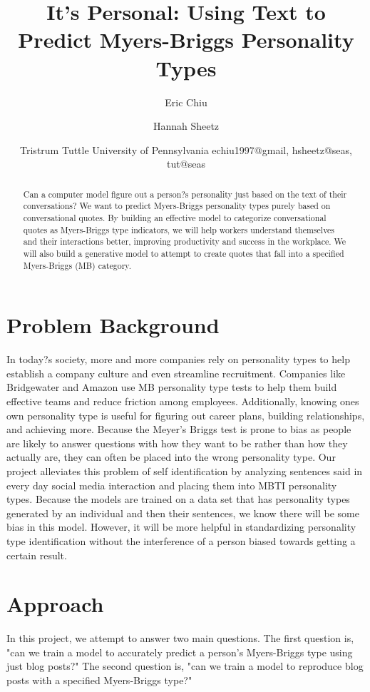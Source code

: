 \documentclass{article}
\title{It's Personal: Using Text to Predict Myers-Briggs Personality Types}
\author{
Eric Chiu\and
Hannah Sheetz\and
Tristrum Tuttle
\affiliations
University of Pennsylvania
\emails
echiu1997@gmail, hsheetz@seas, tut@seas
}
\begin{document}
\maketitle

\begin{abstract}
Can a computer model figure out a person?s personality just based on the text of their conversations? We want to predict Myers-Briggs personality types purely based on conversational quotes. By building an effective model to categorize conversational quotes as Myers-Briggs type indicators, we will help workers understand themselves and their interactions better, improving productivity and success in the workplace. We will also build a generative model to attempt to create quotes that fall into a specified Myers-Briggs (MB) category.
\end{abstract}

\section{Problem Background}
In today?s society, more and more companies rely on personality types to help establish a company culture and even streamline recruitment. Companies like Bridgewater and Amazon use MB personality type tests to help them build effective teams and reduce friction among employees. Additionally, knowing ones own personality type is useful for figuring out career plans, building relationships, and achieving more. Because the Meyer's Briggs test is prone to bias as people are likely to answer questions with how they want to be rather than how they actually are, they can often be placed into the wrong personality type. Our project alleviates this problem of self identification by analyzing sentences said in every day social media interaction and placing them into MBTI personality types. Because the models are trained on a data set that has personality types generated by an individual and then their sentences, we know there will be some bias in this model. However, it will be more helpful in standardizing personality type identification without the interference of a person biased towards getting a certain result. 

\section{Approach}
In this project, we attempt to answer two main questions. The first question is, "can we train a model to accurately predict a person's Myers-Briggs type using just blog posts?" The second question is, "can we train a model to reproduce blog posts with a specified Myers-Briggs type?" 
\end{document}
